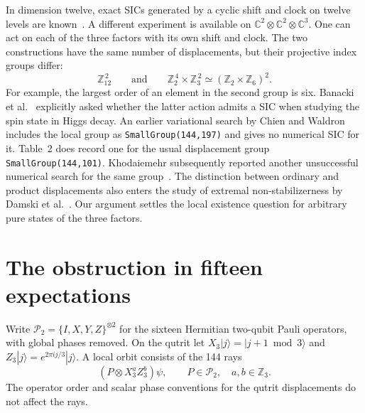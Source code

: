 \documentclass[11pt]{article}
\newcommand{\CC}{\mathbb C}\newcommand{\ZZ}{\mathbb Z}\newcommand{\RR}{\mathbb R}
\newcommand{\cP}{\mathcal P}\newcommand{\one}{\mathbf 1}
\begin{document}
In dimension twelve, exact SICs generated by a cyclic shift and clock on twelve levels are known~\cite{appleby}. A different experiment is available on $\CC^2\otimes\CC^2\otimes\CC^3$. One can act on each of the three factors with its own shift and clock. The two constructions have the same number of displacements, but their projective index groups differ:
\[
     \ZZ_{12}^{\,2}
     \qquad\text{and}\qquad
     \ZZ_2^{\,4}\times\ZZ_3^{\,2}\simeq(\ZZ_2\times\ZZ_6)^2.
\]
For example, the largest order of an element in the second group is six. Banacki et al.~\cite[Sec.~5.1]{banacki} explicitly asked whether the latter action admits a SIC when studying the spin state in Higgs decay. An earlier variational search by Chien and Waldron~\cite[Sec.~5, Table~2]{chien} includes the local group as \texttt{SmallGroup(144,197)} and gives no numerical SIC for it. Table~2 does record one for the usual displacement group \texttt{SmallGroup(144,101)}. Khodaiemehr subsequently reported another unsuccessful numerical search for the same group~\cite[Sec.~III]{ghost}. The distinction between ordinary and product displacements also enters the study of extremal non-stabilizerness by Damski et al.~\cite{damski}. Our argument settles the local existence question for arbitrary pure states of the three factors.

\section{The obstruction in fifteen expectations}

Write $\cP_2=\{I,X,Y,Z\}^{\otimes 2}$ for the sixteen Hermitian two-qubit Pauli operators, with global phases removed. On the qutrit let $X_3|j\rangle=|j+1\bmod3\rangle$ and $Z_3|j\rangle=e^{2\pi i j/3}|j\rangle$. A local orbit consists of the 144 rays
\[
       (P\otimes X_3^a Z_3^b)\psi,\qquad P\in\cP_2,\quad a,b\in\ZZ_3.
\]
The operator order and scalar phase conventions for the qutrit displacements do not affect the rays.
\end{document}
